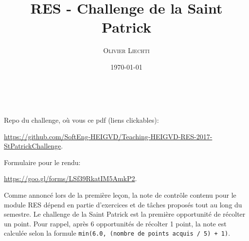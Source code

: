 \documentclass[a4paper, french, 10pt]{article} %
\title{RES - Challenge de la Saint Patrick} %
\author{\textsc{Olivier Liechti}} %
\date{\today} %
\makeatletter
\renewcommand{\maketitle}{ %
\begin{flushright} %
{\LARGE\@title} %

\vspace{5pt} %

{\large\@author} %
\\\@date %

\vspace{-10pt} %
\end{flushright}
}
\makeatother
\begin{document}
\maketitle %





\vspace{30pt} %


\begin{framed}
Repo du challenge, où vous ce pdf (liens clickables):

\url{https://github.com/SoftEng-HEIGVD/Teaching-HEIGVD-RES-2017-StPatrickChallenge}.

Formulaire pour le rendu:

\url{https://goo.gl/forms/LSf39RkatIM5AmkP2}.
\end{framed}

\begin{framed}
Comme annoncé lors de la première leçon, la note de contrôle contenu pour le module RES dépend en partie d'exercices et de tâches proposés tout au long du semestre. Le challenge de la Saint Patrick est la première opportunité de récolter un point. Pour rappel, après 6 opportunités de récolter 1 point, la note est calculée selon la formule \texttt{min(6.0, (nombre de points acquis / 5) + 1)}.
\end{framed}
\end{document}
